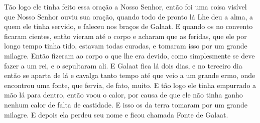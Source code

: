 Tão logo ele tinha feito essa oração a Nosso Senhor, então foi uma coisa visível
que Nosso Senhor ouviu sua oração, quando todo de pronto lá Lhe deu a alma, a
quem ele tinha servido, e faleceu nos braços de Galaat. E quando os no convento
ficaram cientes, então vieram até o corpo e acharam que as feridas, que ele por
longo tempo tinha tido, estavam todas curadas, e tomaram isso por um grande
milagre. Então fizeram ao corpo o que lhe era devido, como simplesmente se deve
fazer a um rei, e o sepultaram ali. E Galaat fica lá dois dias, e no
terceiro dia então se aparta de lá e cavalga tanto tempo até que veio a um
grande ermo, onde encontrou uma fonte, que fervia, de fato, muito. E tão logo
ele tinha empurrado a mão lá para dentro, então voou o calor, por causa de que
ele não tinha ganho nenhum calor de falta de castidade. E isso os da terra
tomaram por um grande milagre. E depois ela perdeu seu nome e ficou chamada
Fonte de Galaat. 

